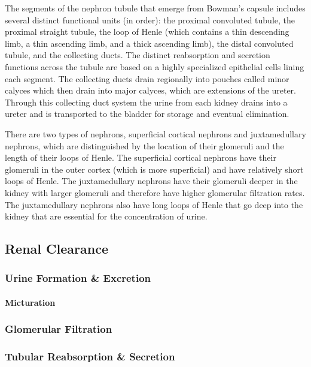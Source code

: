The segments of the nephron tubule that emerge from Bowman’s capsule includes several distinct functional units (in order): the proximal convoluted tubule, the proximal straight tubule, the loop of Henle (which contains a thin descending limb, a thin ascending limb, and a thick ascending limb), the distal convoluted tubule, and the collecting ducts. The distinct reabsorption and secretion functions across the tubule are based on a highly specialized epithelial cells lining each segment. The collecting ducts drain regionally into pouches called minor calyces which then drain into major calyces, which are extensions of the ureter. Through this collecting duct system the urine from each kidney drains into a ureter and is transported to the bladder for storage and eventual elimination.

There are two types of nephrons, superficial cortical nephrons and juxtamedullary nephrons, which are distinguished by the location of their glomeruli and the length of their loops of Henle. The superficial cortical nephrons have their glomeruli in the outer cortex (which is more superficial) and have relatively short loops of Henle. The juxtamedullary nephrons have their glomeruli deeper in the kidney with larger glomeruli and therefore have higher glomerular filtration rates. The juxtamedullary nephrons also have long loops of Henle that go deep into the kidney that are essential for the concentration of urine. 

\subsection{Renal Clearance}

\subsubsection{Urine Formation \& Excretion}


\paragraph{Micturation}

\subsubsection{Glomerular Filtration}

\subsubsection{Tubular Reabsorption \& Secretion}

